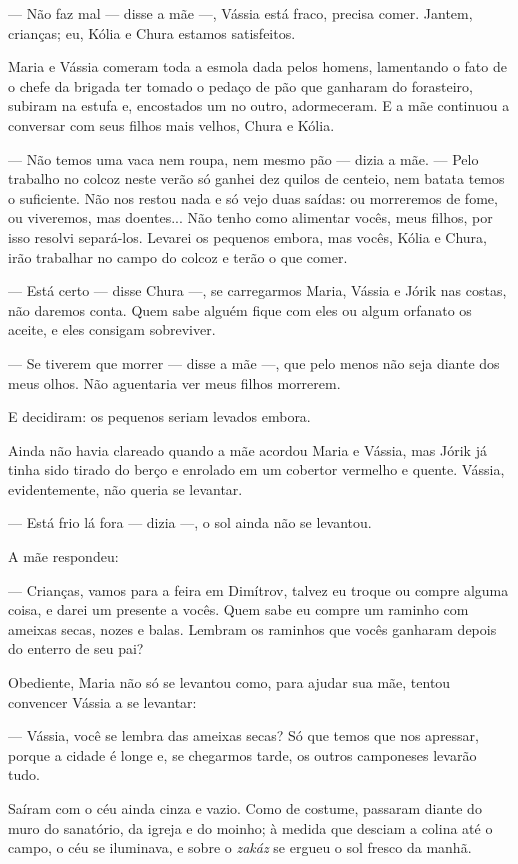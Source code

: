 --- Não faz mal --- disse a mãe ---, Vássia está fraco, precisa comer.
Jantem, crianças; eu, Kólia e Chura estamos satisfeitos.

Maria e Vássia comeram toda a esmola dada pelos homens, lamentando o
fato de o chefe da brigada ter tomado o pedaço de pão que ganharam do
forasteiro, subiram na estufa e, encostados um no outro, adormeceram. E
a mãe continuou a conversar com seus filhos mais velhos, Chura e Kólia.

--- Não temos uma vaca nem roupa, nem mesmo pão --- dizia a mãe. ---
Pelo trabalho no colcoz neste verão só ganhei dez quilos de centeio, nem
batata temos o suficiente. Não nos restou nada e só vejo duas saídas: ou
morreremos de fome, ou viveremos, mas doentes... Não tenho como
alimentar vocês, meus filhos, por isso resolvi separá-los. Levarei os
pequenos embora, mas vocês, Kólia e Chura, irão trabalhar no campo do
colcoz e terão o que comer.

--- Está certo --- disse Chura ---, se carregarmos Maria, Vássia e Jórik
nas costas, não daremos conta. Quem sabe alguém fique com eles ou algum
orfanato os aceite, e eles consigam sobreviver.

--- Se tiverem que morrer --- disse a mãe ---, que pelo menos não seja
diante dos meus olhos. Não aguentaria ver meus filhos morrerem.

E decidiram: os pequenos seriam levados embora.

Ainda não havia clareado quando a mãe acordou Maria e Vássia, mas Jórik
já tinha sido tirado do berço e enrolado em um cobertor vermelho e
quente. Vássia, evidentemente, não queria se levantar.

--- Está frio lá fora --- dizia ---, o sol ainda não se levantou.

A mãe respondeu:

--- Crianças, vamos para a feira em Dimítrov, talvez eu troque ou compre
alguma coisa, e darei um presente a vocês. Quem sabe eu compre um
raminho com ameixas secas, nozes e balas. Lembram os raminhos que vocês
ganharam depois do enterro de seu pai?

Obediente, Maria não só se levantou como, para ajudar sua mãe, tentou
convencer Vássia a se levantar:

--- Vássia, você se lembra das ameixas secas? Só que temos que nos
apressar, porque a cidade é longe e, se chegarmos tarde, os outros
camponeses levarão tudo.

Saíram com o céu ainda cinza e vazio. Como de costume, passaram diante
do muro do sanatório, da igreja e do moinho; à medida que desciam a
colina até o campo, o céu se iluminava, e sobre o \emph{zakáz} se ergueu
o sol fresco da manhã.

